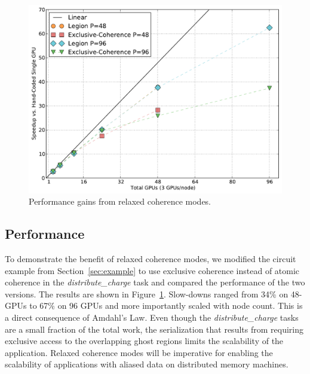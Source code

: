 \begin{figure}
\begin{center}
\includegraphics[scale=0.33]{figs/circuit_coherence.pdf}
\end{center}
\vspace{-2mm}
\caption{Performance gains from relaxed coherence modes.\label{fig:circuit_excl}}
\vspace{-6mm}
\end{figure}

\subsection{Performance}
\label{subsec:relaxedperf}

To demonstrate the benefit of relaxed coherence modes, we modified the circuit example from Section~\ref{sec:example}
to use exclusive coherence instead of atomic coherence in the {\em distribute\_charge} task and compared 
the performance of the two versions.
The results are shown in Figure~\ref{fig:circuit_excl}.  Slow-downs ranged from 34\% on 48-GPUs to 67\% on 
96 GPUs and more importantly scaled with node count.  This is a direct consequence of Amdahl's Law.  
Even though the {\em distribute\_charge} tasks are a small fraction of the total work, the serialization 
that results from requiring exclusive access to the 
overlapping ghost regions limits the scalability of the application.  Relaxed coherence modes will be 
imperative for enabling the scalability of applications with aliased data on distributed memory machines.



